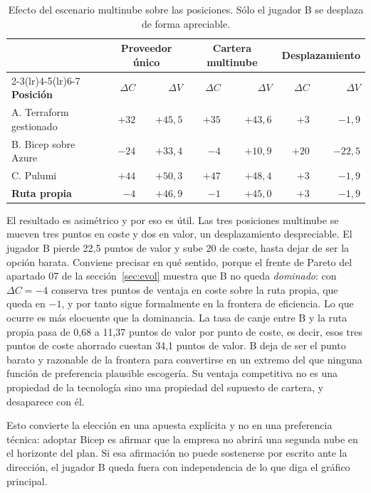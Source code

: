 \documentclass[11pt,letterpaper]{article}
\begin{document}
\begin{table}[htbp]
  \centering
  \footnotesize
  \setlength{\tabcolsep}{6pt}
  \caption{Efecto del escenario multinube sobre las posiciones. Sólo el
  jugador B se desplaza de forma apreciable.}
  \label{tab:sensib}
  \begin{tabular}{@{}lrrrrrr@{}}
    \toprule
    & \multicolumn{2}{c}{\textbf{Proveedor único}} &
      \multicolumn{2}{c}{\textbf{Cartera multinube}} &
      \multicolumn{2}{c}{\textbf{Desplazamiento}} \\
    \cmidrule(lr){2-3}\cmidrule(lr){4-5}\cmidrule(lr){6-7}
    \textbf{Posición} & $\Delta C$ & $\Delta V$ & $\Delta C$ & $\Delta V$ &
      $\Delta C$ & $\Delta V$ \\
    \midrule
    A. Terraform gestionado & $+32$ & $+45{,}5$ & $+35$ & $+43{,}6$ &
      $+3$ & $-1{,}9$ \\
    B. Bicep sobre Azure    & $-24$ & $+33{,}4$ & $-4$  & $+10{,}9$ &
      $+20$ & $-22{,}5$ \\
    C. Pulumi               & $+44$ & $+50{,}3$ & $+47$ & $+48{,}4$ &
      $+3$ & $-1{,}9$ \\
    \textbf{Ruta propia}    & $-4$  & $+46{,}9$ & $-1$  & $+45{,}0$ &
      $+3$ & $-1{,}9$ \\
    \bottomrule
  \end{tabular}
\end{table}

El resultado es asimétrico y por eso es útil. Las tres posiciones multinube se
mueven tres puntos en coste y dos en valor, un desplazamiento despreciable. El
jugador B pierde 22,5 puntos de valor y sube 20 de coste, hasta dejar de ser
la opción barata. Conviene precisar en qué sentido, porque el frente de
Pareto del apartado 07 de la sección~\ref{sec:evol} muestra que B no queda
\emph{dominado}: con $\Delta C = -4$ conserva tres puntos de ventaja en coste
sobre la ruta propia, que queda en $-1$, y por tanto sigue formalmente en la
frontera de eficiencia. Lo que ocurre es más elocuente que la dominancia. La
tasa de canje entre B y la ruta propia pasa de 0,68 a 11,37 puntos de valor
por punto de coste, es decir, esos tres puntos de coste ahorrado cuestan 34,1
puntos de valor. B deja de ser el punto barato y razonable de la frontera para
convertirse en un extremo del que ninguna función de preferencia plausible
escogería. Su ventaja competitiva no es una propiedad de la tecnología sino
una propiedad del supuesto de cartera, y desaparece con él.

Esto convierte la elección en una apuesta explícita y no en una preferencia
técnica: adoptar Bicep es afirmar que la empresa no abrirá una segunda nube en
el horizonte del plan. Si esa afirmación no puede sostenerse por escrito ante
la dirección, el jugador B queda fuera con independencia de lo que diga el
gráfico principal.
\end{document}
